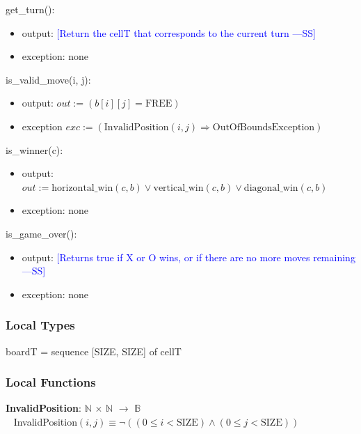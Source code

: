 \documentclass[12pt,fleqn]{examtst}
\newcommand{\authornote}[3]{\textcolor{#1}{[#3 ---#2]}}
\newcommand{\authornote}[3]{}
\newcommand{\wss}[1]{\authornote{blue}{SS}{#1}}
\begin{document}
\noindent get\_turn():
\begin{itemize}
\item output: \wss{Return the cellT that corresponds to the current turn}\\

\item exception: none
\end{itemize}

\noindent is\_valid\_move(i, j):
\begin{itemize}
\item output: $\mathit{out} := (b[i][j] = \mbox{FREE})$ 
\item exception $exc := (\mbox{InvalidPosition}(i, j) \Rightarrow \mbox{OutOfBoundsException})$
\end{itemize}

\noindent is\_winner(c):
\begin{itemize}
\item output: $\mathit{out} := \mbox{horizontal\_win}(c, b) \vee \mbox{vertical\_win}(c, b) \vee
\mbox{diagonal\_win}(c, b)$ 
\item exception: none
\end{itemize}

\noindent is\_game\_over():
\begin{itemize}
\item output: \wss{Returns true if X or O wins, or if there are no more moves remaining}\\

\item exception: none
\end{itemize}

\subsubsection* {Local Types}

boardT = sequence [SIZE, SIZE] of cellT

\subsubsection* {Local Functions}

\noindent \textbf{InvalidPosition}: $\mathbb{N}$ $\times$ $\mathbb{N}$ $\rightarrow$ $\mathbb{B}$\\
~\newline
InvalidPosition$(i, j) \equiv \neg ( ( 0 \leq i < \mbox{SIZE} ) \wedge ( 0 \leq j < \mbox{SIZE}))$

~\newline
\end{document}
